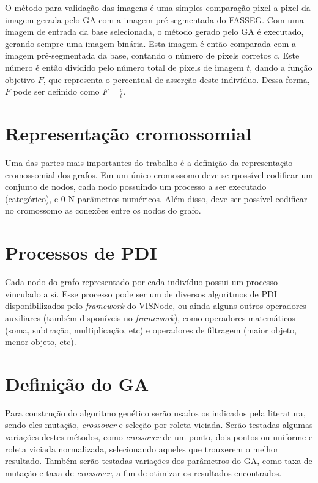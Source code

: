 \documentclass[12pt,oneside,a4paper,english,french,spanish,brazil,]{abntex2}
\begin{document}
O método para validação das imagens é uma simples comparação pixel a pixel da imagem gerada pelo GA com a imagem pré-segmentada do FASSEG. Com uma imagem de entrada da base selecionada, o método gerado pelo GA é executado, gerando sempre uma imagem binária. Esta imagem é então comparada com a imagem pré-segmentada da base, contando o número de pixels corretos \(c\). Este número é então dividido pelo número total de pixels de imagem \(t\), dando a função objetivo \(F\), que representa o percentual de asserção deste indivíduo. Dessa forma, \(F\) pode ser definido como \(F = \frac{c}{t}\).

\section{Representação cromossomial}

Uma das partes mais importantes do trabalho é a definição da representação cromossomial dos grafos. Em um único cromossomo deve se rpossível codificar um conjunto de nodos, cada nodo possuindo um processo a ser executado (categórico), e 0-N parâmetros numéricos. Além disso, deve ser possível codificar no cromossomo as conexões entre os nodos do grafo.

\section{Processos de PDI}

Cada nodo do grafo representado por cada indivíduo possui um processo vinculado a si. Esse processo pode ser um de diversos algoritmos de PDI disponibilizados pelo \textit{framework} do VISNode, ou ainda alguns outros operadores auxiliares (também disponíveis no \textit{framework}), como operadores matemáticos (soma, subtração, multiplicação, etc) e operadores de filtragem (maior objeto, menor objeto, etc).

\section{Definição do GA}

Para construção do algoritmo genético serão usados os indicados pela literatura, sendo eles mutação, \textit{crossover} e seleção por roleta viciada. Serão testadas algumas variações destes métodos, como \textit{crossover} de um ponto, dois pontos ou uniforme e roleta viciada normalizada, selecionando aqueles que trouxerem o melhor resultado. Também serão testadas variações dos parâmetros do GA, como taxa de mutação e taxa de \textit{crossover}, a fim de otimizar os resultados encontrados.
\end{document}
